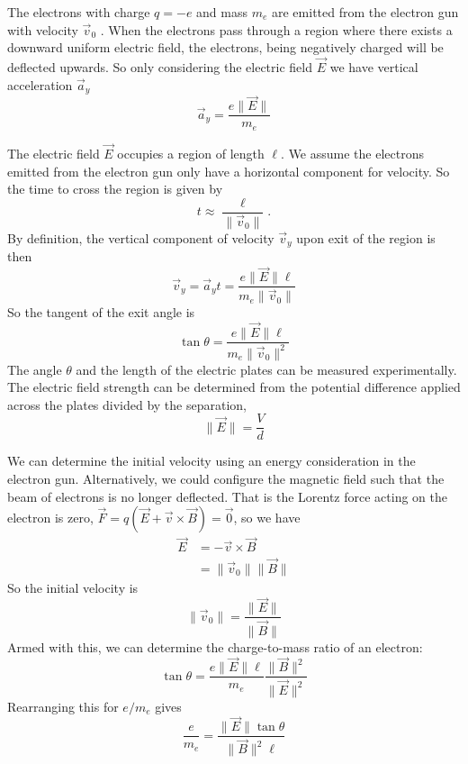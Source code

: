 The electrons with charge $q = -e$ and mass $m_e$ are emitted from the electron gun with velocity $\vec{v}_0$ . When the electrons pass through a region where there exists a downward uniform electric field, the electrons, being negatively charged will be deflected upwards. So only considering the electric field $\vec{E}$ we have vertical acceleration $\vec{a}_y$
\begin{equation}
    \vec{a}_y = \frac{e \| \vec{E}\|}{m_e} 
\end{equation}
    
The electric field $\vec{E}$ occupies a region of length $\ell$. We assume the electrons emitted from the electron gun only have a horizontal component for velocity. So the time to cross the region is given by
\begin{equation}
    t \approx \frac{\ell}{\| \vec{v}_0 \|}.
\end{equation}
By definition, the vertical component of velocity $\vec{v}_y$ upon exit of the region is then
\begin{equation}
    \vec{v}_y = \vec{a}_y t = \frac{e \|\vec{E}\| \ell}{m_e \| \vec{v}_0 \|}
\end{equation}
So the tangent of the exit angle is
\begin{equation}
    \tan \theta = \frac{e \| \vec{E} \| \ell}{m_e \| \vec{v}_0 \|^2}
\end{equation}
The angle $\theta$ and the length of the electric plates can be measured experimentally. The electric field strength can be determined from the potential difference applied across the plates divided by the separation, 
\begin{equation}
    \| \vec{E} \| = \frac{V}{d}
\end{equation}

We can determine the initial velocity using an energy consideration in the electron gun. Alternatively, we could configure the magnetic field such that the beam of electrons is no longer deflected. That is the Lorentz force acting on the electron is zero, $\vec{F} = q(\vec{E} + \vec{v} \times \vec{B}) = \vec{0}$, so we have
\begin{align}
    \vec{E} &= - \vec{v} \times \vec{B} \\
    &= \| \vec{v}_0 \| \| \vec{B} \|
\end{align}
So the initial velocity is
\begin{equation}
    \| \vec{v}_0 \| = \frac{\| \vec{E} \|}{\| \vec{B} \|}
\end{equation}
Armed with this, we can determine the charge-to-mass ratio of an electron:
\begin{equation}
    \tan \theta = \frac{e \| \vec{E} \| \ell}{m_e} \frac{\|\vec{B}\|^2}{\| \vec{E} \|^2} 
\end{equation}
Rearranging this for $e / m_e$ gives
\begin{equation}
    \frac{e}{m_e} = \frac{\| \vec{E} \| \tan \theta}{\| \vec{B} \|^2 \ell}
\end{equation}
